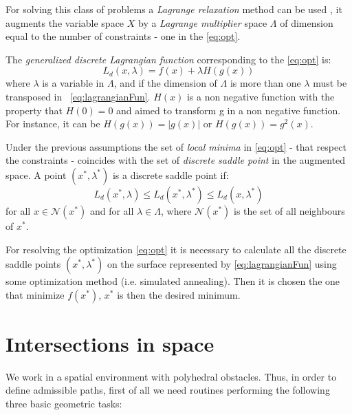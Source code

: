 \documentclass[dissertation.tex]{subfiles}
\begin{document}
For solving this class
of problems a \emph{Lagrange relaxation} method can be used \cite{bertsekas}, it
augments the variable space $X$ by a \emph{Lagrange multiplier} space
$\Lambda$ of dimension equal to the number of constraints - one in the
\cref{eq:opt}.

The \emph{generalized discrete Lagrangian
  function} corresponding to the \cref{eq:opt} is:
\begin{equation}\label{eq:lagrangianFun}
  L_d(x,\lambda)=f(x)+\lambda H(g(x))
\end{equation}
where $\lambda$ is a variable in $\Lambda$, and if the dimension of
$\Lambda$ is more than one $\lambda$ must be transposed in
~\cref{eq:lagrangianFun}. $H(x)$ is a non negative function
with the property that $H(0)=0$ and aimed to transform g in a non
negative function. For instance, it can be  $H(g(x))=|g(x)|$ or
$H(g(x))=g^2(x)$. 

Under the previous assumptions the set of \emph{local minima}
in \cref{eq:opt} - that respect the constraints -  coincides
with the set of \emph{discrete saddle point}
in the augmented space. A point $(x^*,\lambda^*)$ is a discrete saddle
point if:
\begin{equation*}
  L_d(x^*,\lambda)\leq L_d(x^*,\lambda^*)\leq L_d(x,\lambda^*)
\end{equation*}
for all $x\in\mathcal{N}(x^*)$ and for all $\lambda\in\Lambda$, where
$\mathcal{N}(x^*)$ is the set of all neighbours of $x^*$.

For resolving the optimization \cref{eq:opt} it is necessary to
calculate all the discrete saddle points $(x^*,\lambda^*)$ on the surface
represented by
\cref{eq:lagrangianFun} using some
optimization method (i.e. simulated annealing). Then it is chosen
the one that minimize $f(x^*)$, $x^*$ is then the desired minimum.

\section{Intersections in space}\label{sec:intersections}
We work in a spatial environment with polyhedral obstacles. Thus, in
order to define admissible paths, first of all we need routines
performing the following three basic geometric tasks: 
\end{document}
